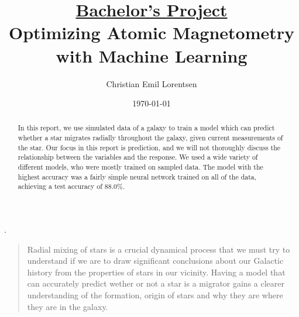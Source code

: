 \documentclass[%
 aapm,
 mph,%
 amsmath,amssymb,
 reprint,%
]{revtex4-2}
\begin{document}
\noindent
{}

\title[]{\underline{Bachelor's Project} \\
Optimizing Atomic Magnetometry with Machine Learning}.%

\author{Christian Emil Lorentsen}%


\date{\today}%
\begin{abstract}
In this report, we use simulated data of a galaxy to train a model which can predict whether a star migrates radially throughout the galaxy, given current measurements of the star. Our focus in this report is prediction, and we will not thoroughly discuss the relationship between the variables and the response.%
We used a wide variety of different models, who were mostly trained on sampled data. The model with the highest accuracy was a fairly simple neural network trained on all of the data, achieving a test accuracy of 88.0\%.
\end{abstract}

\maketitle
\linenumbers\relax %
\begin{quotation}
Radial mixing of stars is a crucial dynamical process that we must try to understand if we are to draw significant conclusions about our Galactic history from the properties of stars in our vicinity. Having a model that can accurately predict wether or not a star is a migrator  gains a clearer understanding of the formation, origin of stars and why they are where they are in the galaxy.%
\end{quotation}


% 
% 
\end{document}
